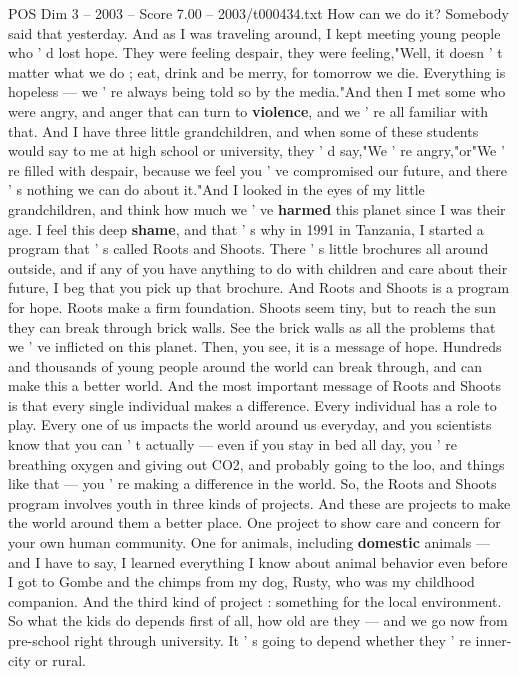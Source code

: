 \begin{textsample}{POS Dim 3 – 2003 – Score 7.00 – 2003/t000434.txt}
How can we do it?
Somebody said that yesterday.
And as I was traveling around, I kept meeting young people who ' d lost hope.
They were feeling despair, they were feeling,"Well, it doesn ' t matter what we do ; eat, drink and be merry, for tomorrow we die.
Everything is hopeless — we ' re always being told so by the media."And then I met some who were angry, and anger that can turn to \textbf{violence}, and we ' re all familiar with that.
And I have three little grandchildren, and when some of these students would say to me at high school or university, they ' d say,"We ' re angry,"or"We ' re filled with despair, because we feel you ' ve compromised our future, and there ' s nothing we can do about it."And I looked in the eyes of my little grandchildren, and think how much we ' ve \textbf{harmed} this planet since I was their age.
I feel this deep \textbf{shame}, and that ' s why in 1991 in Tanzania, I started a program that ' s called Roots and Shoots.
There ' s little brochures all around outside, and if any of you have anything to do with children and care about their future, I beg that you pick up that brochure.
And Roots and Shoots is a program for hope.
Roots make a firm foundation.
Shoots seem tiny, but to reach the sun they can break through brick walls.
See the brick walls as all the problems that we ' ve inflicted on this planet.
Then, you see, it is a message of hope.
Hundreds and thousands of young people around the world can break through, and can make this a better world.
And the most important message of Roots and Shoots is that every single individual makes a difference.
Every individual has a role to play.
Every one of us impacts the world around us everyday, and you scientists know that you can ' t actually — even if you stay in bed all day, you ' re breathing oxygen and giving out CO2, and probably going to the loo, and things like that — you ' re making a difference in the world.
So, the Roots and Shoots program involves youth in three kinds of projects.
And these are projects to make the world around them a better place.
One project to show care and concern for your own human community.
One for animals, including \textbf{domestic} animals — and I have to say, I learned everything I know about animal behavior even before I got to Gombe and the chimps from my dog, Rusty, who was my childhood companion.
And the third kind of project : something for the local environment.
So what the kids do depends first of all, how old are they — and we go now from pre-school right through university.
It ' s going to depend whether they ' re inner-city or rural.

\end{textsample}
